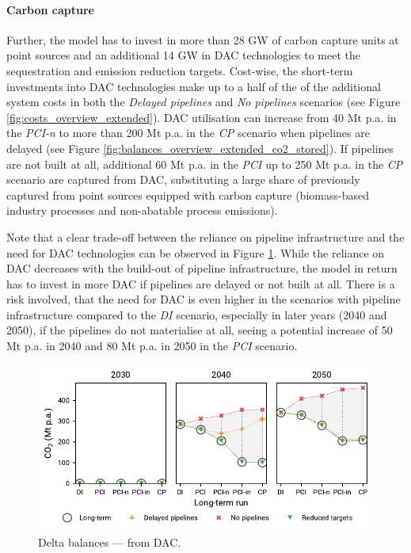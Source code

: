 \documentclass[final,5p,times,twocolumn,sort&compress]{elsarticle}
\begin{document}
\paragraph{Carbon capture}
Further, the model has to invest in more than 28 GW of carbon capture units at point sources and an additional 14 GW in DAC technologies to meet the sequestration and emission reduction targets. Cost-wise, the short-term investments into DAC technologies make up to a half of the of the additional system costs in both the \textit{Delayed pipelines} and \textit{No pipelines} scenarios (see Figure \ref{fig:costs_overview_extended}). DAC utilisation can increase from 40 Mt p.a. in the \textit{PCI-n} to more than 200 Mt p.a. in the \textit{CP} scenario when pipelines are delayed (see Figure \ref{fig:balances_overview_extended_co2_stored}). If pipelines are not built at all, additional 60 Mt p.a. in the \textit{PCI} up to 250 Mt p.a. in the \textit{CP} scenario are captured from DAC, substituting a large share of  previously captured from point sources equipped with carbon capture (biomass-based industry processes and non-abatable process emissions).

Note that a clear trade-off between the reliance on pipeline infrastructure and the need for DAC technologies can be observed in Figure \ref{fig:delta_balances_dac}. While the reliance on DAC decreases with the build-out of pipeline infrastructure, the model in return has to invest in more DAC if pipelines are delayed or not built at all. There is a risk involved, that the need for DAC is even higher in the scenarios with pipeline infrastructure compared to the \textit{DI} scenario, especially in later years (2040 and 2050), if the pipelines do not materialise at all, seeing a potential increase of 50 Mt p.a. in 2040 and 80 Mt p.a. in 2050 in the \textit{PCI} scenario.

\begin{figure}[htbp]
  \centering
  \includegraphics[width=\linewidth]{delta_balances_DAC}
  \caption{Delta balances ---  from DAC.}
  \label{fig:delta_balances_dac}
\end{figure}
\end{document}
